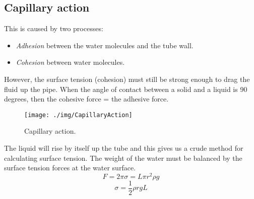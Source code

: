 \subsection{Capillary action}
This is caused by two processes:
\begin{itemize}[noitemsep]
  \item \emph{Adhesion} between the water molecules and the tube wall.
  \item \emph{Cohesion} between water molecules.
\end{itemize}
However, the surface tension (cohesion) must still be strong enough to drag the fluid up the pipe. When the angle of contact between a solid and a liquid is 90 degrees, then the cohesive force = the adhesive force.
\begin{figure}[h!]
  \centering
  \texttt{[image: ./img/CapillaryAction]}
  \caption{Capillary action.}
\end{figure}
The liquid will rise by itself up the tube and this gives us a crude method for calculating surface tension. The weight of the water must be balanced by the surface tension forces at the water surface.
\begin{equation}
  F = 2\pi \sigma = L\pi r^2 \rho g
\end{equation}
\begin{equation}
  \sigma = \frac{1}{2}\rho r g L
\end{equation}
